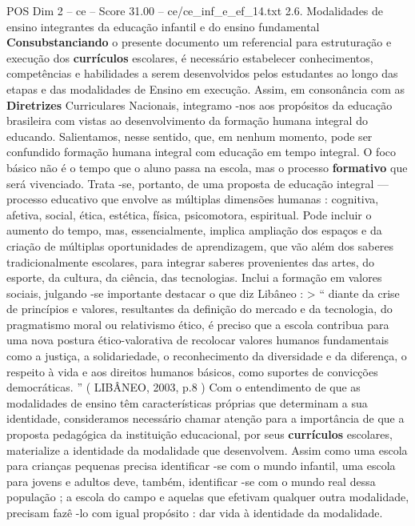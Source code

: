 \begin{textsample}{POS Dim 2 – ce – Score 31.00 – ce/ce\_inf\_e\_ef\_14.txt}  \label{ex:f2_pos_083}
2.6.
Modalidades de ensino integrantes da educação infantil e do ensino fundamental \textbf{Consubstanciando} o presente documento um referencial para estruturação e execução dos \textbf{currículos} escolares, é necessário estabelecer conhecimentos, competências e habilidades a serem desenvolvidos pelos estudantes ao longo das etapas e das modalidades de Ensino em execução.
Assim, em consonância com as \textbf{Diretrizes} Curriculares Nacionais, integramo -nos aos propósitos da educação brasileira com vistas ao desenvolvimento da formação humana integral do educando.
Salientamos, nesse sentido, que, em nenhum momento, pode ser confundido formação humana integral com educação em tempo integral.
O foco básico não é o tempo que o aluno passa na escola, mas o processo \textbf{formativo} que será vivenciado.
Trata -se, portanto, de uma proposta de educação integral — processo educativo que envolve as múltiplas dimensões humanas : cognitiva, afetiva, social, ética, estética, física, psicomotora, espiritual.
Pode incluir o aumento do tempo, mas, essencialmente, implica ampliação dos espaços e da criação de múltiplas oportunidades de aprendizagem, que vão além dos saberes tradicionalmente escolares, para integrar saberes provenientes das artes, do esporte, da cultura, da ciência, das tecnologias.
Inclui a formação em valores sociais, julgando -se importante destacar o que diz Libâneo : > “ diante da crise de princípios e valores, resultantes da definição do mercado e da tecnologia, do pragmatismo moral ou relativismo ético, é preciso que a escola contribua para uma nova postura ético-valorativa de recolocar valores humanos fundamentais como a justiça, a solidariedade, o reconhecimento da diversidade e da diferença, o respeito à vida e aos direitos humanos básicos, como suportes de convicções democráticas. ” ( LIBÂNEO, 2003, p.8 ) Com o entendimento de que as modalidades de ensino têm características próprias que determinam a sua identidade, consideramos necessário chamar atenção para a importância de que a proposta pedagógica da instituição educacional, por seus \textbf{currículos} escolares, materialize a identidade da modalidade que desenvolvem.
Assim como uma escola para crianças pequenas precisa identificar -se com o mundo infantil, uma escola para jovens e adultos deve, também, identificar -se com o mundo real dessa população ; a escola do campo e aquelas que efetivam qualquer outra modalidade, precisam fazê -lo com igual propósito : dar vida à identidade da modalidade.

\end{textsample}
